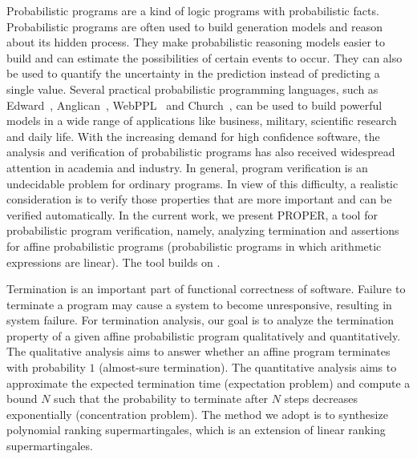 \documentclass[runningheads]{llncs}
\begin{document}
Probabilistic programs are a kind of logic programs with probabilistic facts. Probabilistic programs are often used to build generation models and reason about its hidden process. They make probabilistic reasoning models easier to build and can estimate the possibilities of certain events to occur. They can also be used to quantify the uncertainty in the prediction instead of predicting a single value. Several practical probabilistic programming languages, such as Edward~\cite{tran2016edward}, Anglican~\cite{Dav2016Design}, WebPPL~\cite{Noah2014language} and Church~\cite{Noah2008language}, can be used to build powerful models in a wide range of applications like business, military, scientific research and daily life. %
With the increasing demand for high confidence software, the analysis and verification of probabilistic programs has also received widespread attention in academia and industry. 
In general, program verification is an undecidable problem for ordinary programs.
In view of this difficulty, a realistic consideration is to verify those properties that are more important and can be verified automatically. In the current work, we present PROPER, a tool for probabilistic program verification, namely, analyzing termination and assertions for affine probabilistic programs (probabilistic programs in which arithmetic expressions are linear). The tool builds on \cite{kris2016termination,cha2015algorithmic,Sankaranarayanan2013Static}. 

Termination is an important part of  functional correctness of software. Failure to terminate a program may cause a system to become unresponsive, resulting in system failure. For termination analysis, our goal is to analyze the termination property of a given affine probabilistic program qualitatively and quantitatively. The qualitative analysis aims to answer whether an affine program terminates with probability $1$ (almost-sure termination). The quantitative analysis aims to approximate the expected termination time (expectation problem) and compute a bound $N$ such that the probability to terminate after $N$ steps decreases exponentially (concentration problem). The method we adopt is to synthesize polynomial ranking supermartingales, which is an extension of linear ranking supermartingales. 
\end{document}
